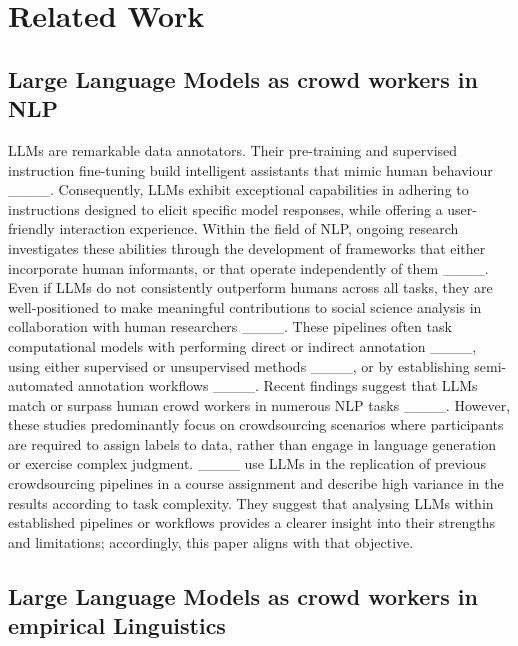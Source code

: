 \section{Related Work}
\label{sec:related}
\subsection{Large Language Models as crowd workers in NLP}

LLMs are remarkable data annotators. Their pre-training and supervised instruction fine-tuning build intelligent assistants that mimic human behaviour ____. Consequently, LLMs exhibit exceptional capabilities in adhering to instructions designed to elicit specific model responses, while offering a user-friendly interaction experience. Within the field of NLP, ongoing research investigates these abilities through the development of frameworks that either incorporate human informants, or that operate independently of them ____. Even if LLMs do not consistently outperform humans across all tasks, they are well-positioned to make meaningful contributions to social science analysis in collaboration with human researchers ____. These pipelines often task computational models with performing direct or indirect annotation ____, using either supervised or unsupervised methods ____, or by establishing semi-automated annotation workflows ____. Recent findings suggest that LLMs match or surpass human crowd workers in numerous NLP tasks ____. However, these studies predominantly focus on crowdsourcing scenarios where participants are required to assign labels to data, rather than engage in language generation or exercise complex judgment. ____ use LLMs in the replication of previous crowdsourcing pipelines in a course assignment and describe high variance in the results according to task complexity. They suggest that analysing LLMs within established pipelines or workflows provides a clearer insight into their strengths and limitations; accordingly, this paper aligns with that objective.


\subsection{Large Language Models as crowd workers in empirical Linguistics}

